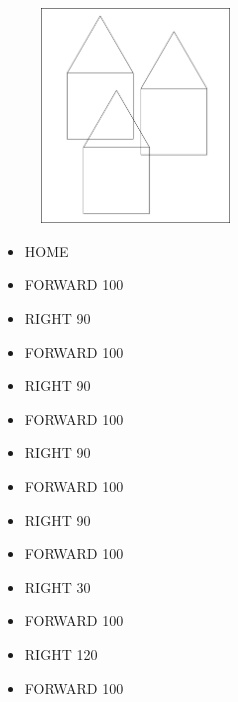 \begin{minipage}{0.5\textwidth}
\begin{figure}[H]
   \includegraphics[width=5.0cm,trim=4 4 6 4,clip]{./images/marta/mar-2.png}
   \label{mar-2}
\end{figure}
\end{minipage} \hfill
\begin{minipage}{0.45\textwidth}
\begin{itemize}[itemsep=-3pt,parsep=2pt]
\item[] \hspace{0.5cm} HOME 
\item[] \hspace{0.5cm} FORWARD 100
\item[] \hspace{0.5cm} RIGHT 90
\item[] \hspace{0.5cm} FORWARD 100
\item[] \hspace{0.5cm} RIGHT 90
\item[] \hspace{0.5cm} FORWARD 100
\item[] \hspace{0.5cm} RIGHT 90
\item[] \hspace{0.5cm} FORWARD 100
\item[] \hspace{0.5cm} RIGHT 90
\item[] \hspace{0.5cm} FORWARD 100
\item[] \hspace{0.5cm} RIGHT 30
\item[] \hspace{0.5cm} FORWARD 100
\item[] \hspace{0.5cm} RIGHT 120
\item[] \hspace{0.5cm} FORWARD 100
\end{itemize}
\end{minipage}


